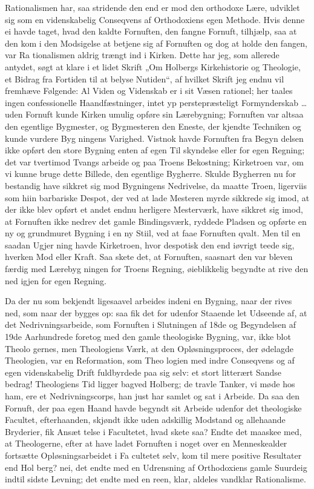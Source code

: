 \documentclass[12pt]{book}
\newcommand{\opage}[1]{\marginnote{\footnotesize\textit{[#1]}}}
\begin{document}
Rationalismen har, saa stridende den end er mod
den orthodoxe Lære, udviklet sig som en videnskabelig
Conseqvens af Orthodoxiens egen Methode. Hvis denne
ei havde taget, hvad den kaldte Fornuften, den fangne
Fornuft, tilhjælp, saa at den kom i den Modsigelse at
betjene sig af Fornuften og dog at holde den fangen, var Ra\-%
tionalismen aldrig trængt ind i Kirken. Dette har jeg, som
allerede antydet, søgt at klare i et lidet Skrift „Om Holbergs
Kirkehistorie og Theologie, et Bidrag fra Fortiden til at
belyse Nutiden“, af hvilket Skrift jeg endnu vil fremhæve
Følgende: Al Viden og Videnskab er i sit Væsen rationel;
her taales ingen confessionelle Haandfæstninger, intet yp\-%
perstepræsteligt Formynderskab \ldots{} uden Fornuft kunde
Kirken umulig opføre sin Lærebygning; Fornuften var
altsaa den egentlige Bygmester, og Bygmesteren den
Eneste, der kjendte Techniken og kunde vurdere Byg\-%
ningens Varighed. Vistnok havde Fornuften fra Begyn\-%
delsen ikke opført den store Bygning enten af egen Til\-%
skyndelse eller for egen Regning; det var tvertimod Tvangs\-%
\opage{251}\setcounter{footnote}{0}%
arbeide og paa Troens Bekostning; Kirketroen var, om
vi kunne bruge dette Billede, den egentlige Bygherre.
Skulde Bygherren nu for bestandig have sikkret sig mod
Bygningens Nedrivelse, da maatte Troen, ligerviis som
hiin barbariske Despot, der ved at lade Mesteren myrde
sikkrede sig imod, at der ikke blev opført et andet endnu
herligere Mesterværk, have sikkret sig imod, at Fornuften
ikke nedrev det gamle Bindingsværk, ryddede Pladsen
og opførte en ny og grundmuret Bygning i en ny Stiil,
ved at faae Fornuften qvalt. Men til en saadan Ugjer\-%
ning havde Kirketroen, hvor despotisk den end iøvrigt
teede sig, hverken Mod eller Kraft. Saa skete det, at
Fornuften, saasnart den var bleven færdig med Lærebyg\-%
ningen for Troens Regning, øieblikkelig begyndte at rive
den ned igjen for egen Regning.

Da der nu som bekjendt ligesaavel arbeides indeni
en Bygning, naar der rives ned, som naar der bygges
op: saa fik det for udenfor Staaende let Udseende af, at
det Nedrivningsarbeide, som Fornuften i Slutningen af
18de og Begyndelsen af 19de Aarhundrede foretog med
den gamle theologiske Bygning, var, ikke blot Theolo\-%
gernes, men Theologiens Værk, at den Opløsningsproces,
der ødelagde Theologien, var en Reformation, som Theo\-%
logien med indre Conseqvens og af egen videnskabelig
Drift fuldbyrdede paa sig selv: et stort litterært Sandse\-%
bedrag! Theologiens Tid ligger bagved Holberg; de travle
Tanker, vi møde hos ham, ere et Nedrivningscorps, han
just har samlet og sat i Arbeide. Da saa den Fornuft,
der paa egen Haand havde begyndt sit Arbeide udenfor
det theologiske Facultet, efterhaanden, skjøndt ikke uden
adskillig Modstand og allehaande Bryderier, fik Ansæt\-%
telse i Facultetet, hvad skete saa? Endte det maaskee
med, at Theologerne, efter at have ladet Fornuften i noget
over en Menneskealder fortsætte Opløsningsarbeidet i Fa\-%
\opage{252}\setcounter{footnote}{0}%
cultetet selv, kom til mere positive Resultater end Hol\-%
berg? nei, det endte med en Udrensning af Orthodoxiens
gamle Suurdeig indtil sidste Levning; det endte med en
reen, klar, aldeles vandklar Rationalisme.
\end{document}
